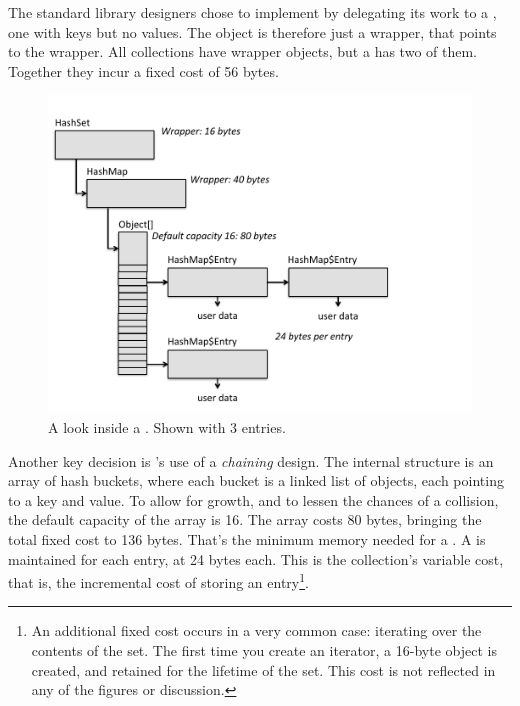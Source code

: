 The standard library designers chose to implement
 by delegating its work
to a , one with keys but no values.
The  object is therefore just a wrapper, that points to the
 wrapper. All collections have
wrapper objects, but a  has two of them. 
Together they incur a fixed cost of 56 bytes.

 \begin{figure}
  \centering
 \includegraphics[width=.80\textwidth]{part1/Figures/collections/inside-hashset.pdf}
  \caption{A look inside a . Shown with 3
  entries.}
  \label{fig:inside-hashset}
\end{figure}

 
Another key decision is 's use of a \emph{chaining}
design. The internal structure is an array of hash buckets,
where each bucket is a linked list of  objects, each
pointing to a key and value.
To allow for growth, and to lessen the chances of a collision, the default
capacity of the array is 16. The array costs 80 bytes, bringing the total fixed
cost to 136 bytes. That's the minimum memory needed for a .
A  is maintained for
each entry, at 24 bytes each. This is the collection's variable
cost, that is, the incremental cost of storing an
entry\footnote{An additional fixed cost occurs in a very common case:
iterating over the contents of the set.
The first time you create an iterator, a 16-byte  object
is created, and retained for the lifetime of the set. This
cost is not reflected in any of the figures or discussion.}.

